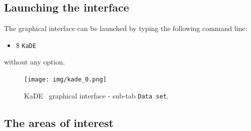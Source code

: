 \documentclass[11pt]{book}
\def\KaDE{\textsf{KaDE}}
\def\ttt#1{\texttt{#1}}
\def\ITE#1{\begin{itemize}#1\end{itemize}}
\begin{document}
\subsection{Launching the interface}

The graphical interface can be launched by typing the following command line:
\ITE{\item[\$] \ttt{KaDE}}

without any option.

\begin{figure}[htbp]
\centering
\texttt{[image: img/kade\_0.png]}
\caption{\KaDE~ graphical interface - sub-tab \texttt{Data set}.}
\label{fig:kade:0}
\end{figure}

\subsection{The areas of interest}
\end{document}
